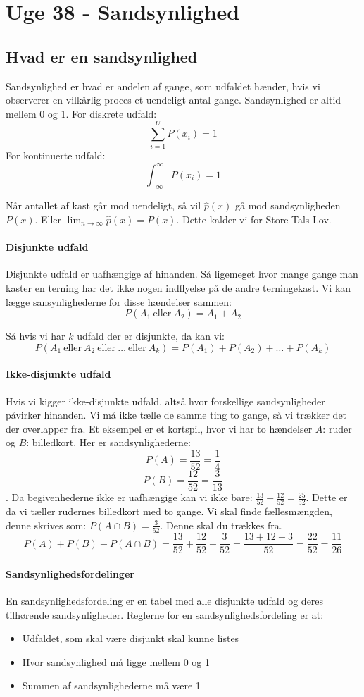 \documentclass{article}
\begin{document}
    \newpage
\section{Uge 38 - Sandsynlighed}
\subsection{Hvad er en sandsynlighed}
Sandsynlighed er hvad er andelen af gange, som udfaldet hænder, hvis vi
observerer en vilkårlig proces et uendeligt antal gange. Sandsynlighed  er altid
mellem 0 og 1. For diskrete udfald:
$$\sum^U_{i=1} P(x_i) = 1 $$
For kontinuerte udfald:
$$\int^{\infty}_{-\infty} P(x_i) = 1 $$

Når antallet af kast går mod uendeligt, så vil $\hat{p}(x)$ gå mod
sandsynligheden $P(x)$. Eller $\lim_{n\rightarrow \infty} \hat{p}(x) = P(x)$.
Dette kalder vi for Store Tals Lov. 

\paragraph{Disjunkte udfald}
Disjunkte udfald er uafhængige af hinanden. Så ligemeget hvor mange gange man
kaster en terning har det ikke nogen indflyelse på de andre terningekast. Vi kan
lægge sansynlighederne for disse hændelser sammen:
$$P(A_1\ \text{eller} \ A_2) = A_1 + A_2$$

Så hvis vi har $k$ udfald der er disjunkte, da kan vi:
$$P(A_1 \ \text{eller} \ A_2 \ \text{eller} \ \dots \ \text{eller} \ A_k) = P(A_1) + P(A_2) + \dots + P(A_k)$$
\paragraph{Ikke-disjunkte udfald}
Hvis vi kigger ikke-disjunkte udfald, altså hvor forskellige sandsynligheder
påvirker hinanden. Vi må ikke tælle de samme ting to gange, så vi trækker det
der overlapper fra. Et eksempel er et kortspil, hvor vi har to hændelser $A$:
ruder og $B$: billedkort. Her er sandsynlighederne: $$P(A)=\frac{13}{52} =
\frac{1}{4}$$ $$P(B) = \frac{12}{52} = \frac{3}{13}$$. Da begivenhederne ikke er
uafhængige kan vi ikke bare: $\frac{13}{52} + \frac{12}{52} = \frac{25}{52}$.
Dette er da vi tæller rudernes billedkort med to gange. Vi skal finde
fællesmængden, denne skrives som: $P(A \cap B) = \frac{3}{52}$. Denne skal du
trækkes fra. 
$$P(A) + P(B) - P(A\cap B) = \frac{13}{52} + \frac{12}{52} - \frac{3}{52} =
\frac{13+12-3}{52}=\frac{22}{52} = \frac{11}{26}$$

\paragraph{Sandsynlighedsfordelinger}
En sandsynlighedsfordeling er en tabel med alle disjunkte udfald og deres
tilhørende sandsynligheder. Reglerne for en sandsynlighedsfordeling er at:
\begin{itemize}
  \item Udfaldet, som skal være disjunkt skal kunne listes
  \item Hvor sandsynlighed må ligge mellem 0 og 1
  \item Summen af sandsynlighederne må være 1
\end{itemize}
\end{document}
